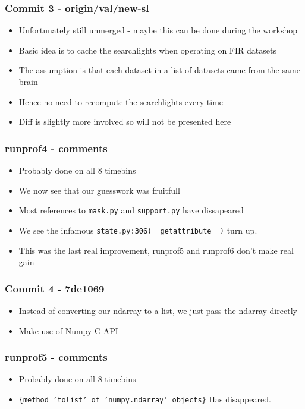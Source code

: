 \begin{frame}
 \frametitle{Commit 3 - origin/val/new-sl}
  


\begin{itemize}
  \item Unfortunately still unmerged - maybe this can be done during the workshop
  \item Basic idea is to cache the searchlights when operating on FIR datasets
  \item The assumption is that each dataset in a list of datasets came from the same brain
  \item Hence no need to recompute the searchlights every time
  \item Diff is slightly more involved so will not be presented here
\end{itemize}

  
 \end{frame}
\begin{frame}
 \frametitle{runprof4 - comments}
  


\begin{itemize}
  \item Probably done on all 8 timebins
  \item We now see that our guesswork was fruitfull
  \item Most references to \texttt{mask.py} and \texttt{support.py} have dissapeared
  \item We see the infamous \texttt{state.py:306(\_\_getattribute\_\_)} turn up.
  \item This was the last real improvement, runprof5 and runprof6 don't make real gain
\end{itemize}

  
 \end{frame}
\begin{frame}
 \frametitle{Commit 4 - 7de1069}
  


\begin{itemize}
  \item Instead of converting our ndarray to a list, we just pass the ndarray directly
  \item Make use of Numpy C API
\end{itemize}

  
 \end{frame}
\begin{frame}
 \frametitle{runprof5 - comments}
  


\begin{itemize}
  \item Probably done on all 8 timebins
  \item \texttt{\{method 'tolist' of 'numpy.ndarray' objects\}} Has disappeared.
\end{itemize}

  
 \end{frame}
